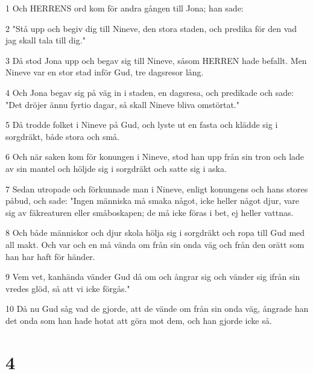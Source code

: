 \par 1 Och HERRENS ord kom för andra gången till Jona; han sade:
\par 2 "Stå upp och begiv dig till Nineve, den stora staden, och predika för den vad jag skall tala till dig."
\par 3 Då stod Jona upp och begav sig till Nineve, såsom HERREN hade befallt. Men Nineve var en stor stad inför Gud, tre dagsresor lång.
\par 4 Och Jona begav sig på väg in i staden, en dagsresa, och predikade och sade: "Det dröjer ännu fyrtio dagar, så skall Nineve bliva omstörtat."
\par 5 Då trodde folket i Nineve på Gud, och lyste ut en fasta och klädde sig i sorgdräkt, både stora och små.
\par 6 Och när saken kom för konungen i Nineve, stod han upp från sin tron och lade av sin mantel och höljde sig i sorgdräkt och satte sig i aska.
\par 7 Sedan utropade och förkunnade man i Nineve, enligt konungens och hans stores påbud, och sade: "Ingen människa må smaka något, icke heller något djur, vare sig av fäkreaturen eller småboskapen; de må icke föras i bet, ej heller vattnas.
\par 8 Och både människor och djur skola hölja sig i sorgdräkt och ropa till Gud med all makt. Och var och en må vända om från sin onda väg och från den orätt som han har haft för händer.
\par 9 Vem vet, kanhända vänder Gud då om och ångrar sig och vänder sig ifrån sin vredes glöd, så att vi icke förgås."
\par 10 Då nu Gud såg vad de gjorde, att de vände om från sin onda väg, ångrade han det onda som han hade hotat att göra mot dem, och han gjorde icke så.

\chapter{4}

